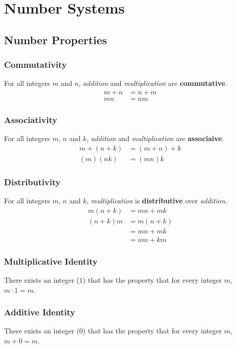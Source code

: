 \documentclass[../notes.tex]{subfiles}
\begin{document}
	\chapter{Number Systems}
		\section{Number Properties}
			\subsection{Commutativity}
				For all integers $m$ and $n$, \textit{addition} and \textit{multiplication} are \textbf{commutative}.
				\begin{align*}
					m + n &= n + m \tag*{addition}\\
					mn &= nm \tag*{multiplication}
				\end{align*}
			\subsection{Associativity}
				For all integers $m$, $n$ and $k$, \textit{addition} and \textit{multiplication} are \textbf{associaive}.
				\begin{align*}
					m+(n+k) &= (m+n)+k \tag*{addition}\\
					(m)(nk) &= (mn)k \tag*{multiplication}
				\end{align*}
			\subsection{Distributivity}
				For all integers $m$, $n$ and $k$, \textit{multiplication} is \textbf{distributive} over \textit{addition}.
				\begin{align*}
					m(n + k) &= mn + mk\\
					(n + k)m &= m(n + k)\\
					&= mn + mk\\
					&= nm + km
				\end{align*}
			\subsection{Multiplicative Identity}
				There exists an integer ($1$) that has the property that for every integer $m$, $m\cdot 1 = m$.
			\subsection{Additive Identity}
				There exists an integer ($0$) that has the property that for every integer $m$, $m + 0 = m$.
\end{document}

